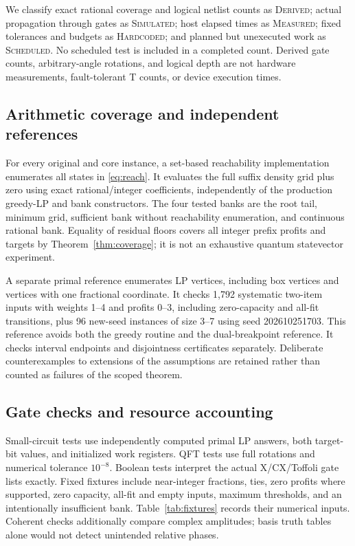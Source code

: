 \documentclass[referee,pdflatex,sn-mathphys-num]{sn-jnl}
\theoremstyle{thmstyleone}
\theoremstyle{thmstyletwo}
\begin{document}
We classify exact rational coverage and logical netlist counts as \textsc{Derived}; actual propagation through gates as \textsc{Simulated}; host elapsed times as \textsc{Measured}; fixed tolerances and budgets as \textsc{Hardcoded}; and planned but unexecuted work as \textsc{Scheduled}. No scheduled test is included in a completed count. Derived gate counts, arbitrary-angle rotations, and logical depth are not hardware measurements, fault-tolerant T counts, or device execution times.

\subsection{Arithmetic coverage and independent references}
For every original and core instance, a set-based reachability implementation enumerates all states in \eqref{eq:reach}. It evaluates the full suffix density grid plus zero using exact rational/integer coefficients, independently of the production greedy-LP and bank constructors. The four tested banks are the root tail, minimum grid, sufficient bank without reachability enumeration, and continuous rational bank. Equality of residual floors covers all integer prefix profits and targets by Theorem~\ref{thm:coverage}; it is not an exhaustive quantum statevector experiment.

A separate primal reference enumerates LP vertices, including box vertices and vertices with one fractional coordinate. It checks 1,792 systematic two-item inputs with weights 1--4 and profits 0--3, including zero-capacity and all-fit transitions, plus 96 new-seed instances of size 3--7 using seed 202610251703. This reference avoids both the greedy routine and the dual-breakpoint reference. It checks interval endpoints and disjointness certificates separately. Deliberate counterexamples to extensions of the assumptions are retained rather than counted as failures of the scoped theorem.

\subsection{Gate checks and resource accounting}
Small-circuit tests use independently computed primal LP answers, both target-bit values, and initialized work registers. QFT tests use full rotations and numerical tolerance $10^{-8}$. Boolean tests interpret the actual X/CX/Toffoli gate lists exactly. Fixed fixtures include near-integer fractions, ties, zero profits where supported, zero capacity, all-fit and empty inputs, maximum thresholds, and an intentionally insufficient bank. Table~\ref{tab:fixtures} records their numerical inputs. Coherent checks additionally compare complex amplitudes; basis truth tables alone would not detect unintended relative phases.
\end{document}
